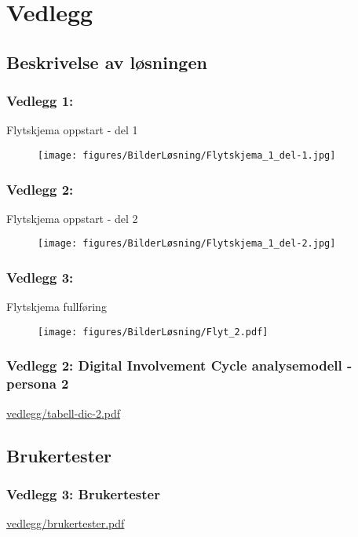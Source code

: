 \chapter{Vedlegg}
\label{chap:vedlegg}
\begin{sloppypar}

\section{\textbf{Beskrivelse av løsningen}}
\subsection{\textbf{Vedlegg 1:}} Flytskjema oppstart - del 1
\label{Flyt_1_1}
\begin{figure}[H] 
    \centering
    \texttt{[image: figures/BilderLøsning/Flytskjema\_1\_del-1.jpg]}
\end{figure}

\subsection{\textbf{Vedlegg 2:}} Flytskjema oppstart - del 2
\label{Flyt_1_2}
\begin{figure}[H] 
    \centering
    \texttt{[image: figures/BilderLøsning/Flytskjema\_1\_del-2.jpg]}
\end{figure}

\subsection{\textbf{Vedlegg 3:}} Flytskjema fullføring
\label{Flyt_2}
\begin{figure}[H] 
    \centering
    \texttt{[image: figures/BilderLøsning/Flyt\_2.pdf]}
\end{figure}

\subsection{\textbf{Vedlegg 2:} Digital Involvement Cycle analysemodell - persona 2}
\label{vedlegg:2}
\url{vedlegg/tabell-dic-2.pdf}

\section{\textbf{Brukertester}}
\subsection{\textbf{Vedlegg 3:} Brukertester}
\label{vedlegg:3}
\url{vedlegg/brukertester.pdf}


\end{sloppypar}
